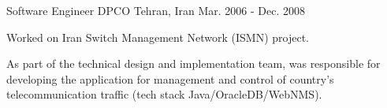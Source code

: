 \begin{cventries}
  \cventry
    {Software Engineer} %
    {DPCO} %
    {Tehran, Iran} %
    {Mar. 2006 - Dec. 2008} %
    {
      \begin{cvitems} %
        \item {Worked on Iran Switch Management Network (ISMN) project.}
        \item {As part of the technical design and implementation team, was responsible for developing the application for management and control of country's telecommunication traffic (tech stack Java/OracleDB/WebNMS).}
      \end{cvitems}
    }

\end{cventries}
